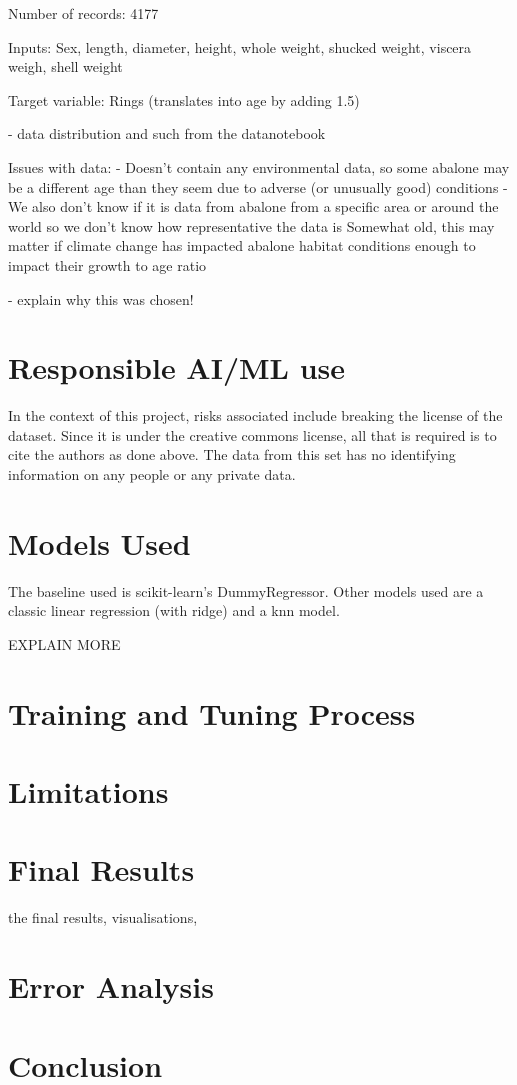 \documentclass[12pt, a4paper]{article}
\begin{document}
Number of records: 4177 

Inputs: Sex, length, diameter, height, whole weight, shucked weight, viscera weigh, shell weight

Target variable: Rings (translates into age by adding 1.5) 

- data distribution and such from the datanotebook

Issues with data:
- Doesn’t contain any environmental data, so some abalone may be a different age than they seem due to adverse (or unusually good) conditions
- We also don’t know if it is data from abalone from a specific area or around the world so we don’t know how representative the data is
Somewhat old, this may matter if climate change has impacted abalone habitat conditions enough to impact their growth to age ratio

 
- explain why this was chosen!

\section{Responsible AI/ML use}
In the context of this project, risks associated include breaking the license of the dataset. Since it is under the creative commons license, all that is required is to cite the authors as done above. The data from this set has no identifying information on any people or any private data.

\section{Models Used}
The baseline used is scikit-learn's DummyRegressor. Other models used are a classic linear regression (with ridge) and a knn model.

EXPLAIN MORE

\section{Training and Tuning Process}

\section{Limitations}

\section{Final Results}
the final results, visualisations, 

\section{Error Analysis}
 
\section{Conclusion}
\end{document}
